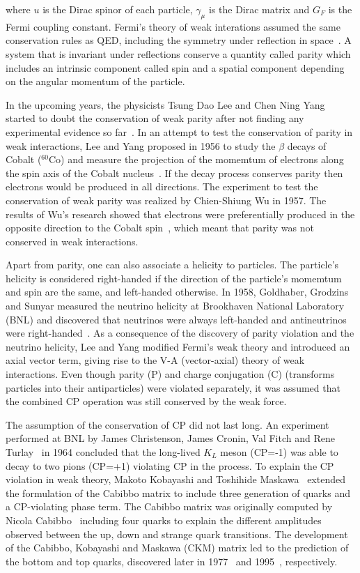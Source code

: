 where $u$ is the Dirac spinor of each particle, $\gamma_{\mu}$ is the Dirac matrix and $G_{F}$ is the Fermi coupling constant. Fermi's theory of weak interations assumed the same conservation rules as QED, including the symmetry under reflection in space~\cite{FermiWeakTheory_2}. A system that is invariant under reflections conserve a quantity called parity which includes an intrinsic component called spin and a spatial component depending on the angular momentum of the particle.

In the upcoming years, the physicists Tsung Dao Lee and Chen Ning Yang started to doubt the conservation of weak parity after not finding any experimental evidence so far~\cite{LeeYang}. In an attempt to test the conservation of parity in weak interactions, Lee and Yang proposed in 1956 to study the $\beta$ decays of Cobalt (${}^{60}$Co) and measure the projection of the momemtum of electrons along the spin axis of the Cobalt nucleus~\cite{LeeYang}. If the decay process conserves parity then electrons would be produced in all directions. The experiment to test the conservation of weak parity was realized by Chien-Shiung Wu in 1957. The results of Wu's research showed that electrons were preferentially produced in the opposite direction to the Cobalt spin~\cite{WuParityViolation}, which meant that parity was not conserved in weak interactions.

Apart from parity, one can also associate a helicity to particles. The particle's helicity is considered right-handed if the direction of the particle's momemtum and spin are the same, and left-handed otherwise. In 1958, Goldhaber, Grodzins and Sunyar measured the neutrino helicity at Brookhaven National Laboratory (BNL) and discovered that neutrinos were always left-handed and antineutrinos were right-handed~\cite{NeutrinoHelicity}. As a consequence of the discovery of parity violation and the neutrino helicity, Lee and Yang modified Fermi's weak theory and introduced an axial vector term, giving rise to the V-A (vector-axial) theory of weak interactions. Even though parity (P) and charge conjugation (C) (transforms particles into their antiparticles) were violated separately, it was assumed that the combined CP operation was still conserved by the weak force.

The assumption of the conservation of CP did not last long. An experiment performed at BNL by James Christenson, James Cronin, Val Fitch and Rene Turlay~\cite{KMeson} in 1964 concluded that the long-lived $K_{L}$ meson (CP=-1) was able to decay to two pions (CP=+1) violating CP in the process. To explain the CP violation in weak theory, Makoto Kobayashi and Toshihide Maskawa~\cite{CKMMatrix} extended the formulation of the Cabibbo matrix to include three generation of quarks and a CP-violating phase term. The Cabibbo matrix was originally computed by Nicola Cabibbo~\cite{CabibboMatrix} including four quarks to explain the different amplitudes observed between the up, down and strange quark transitions. The development of the Cabibbo, Kobayashi and Maskawa (CKM) matrix led to the prediction of the bottom and top quarks, discovered later in 1977~\cite{BottomQuarkDiscovery} and 1995~\cite{TopQuarkDiscovery}, respectively.

